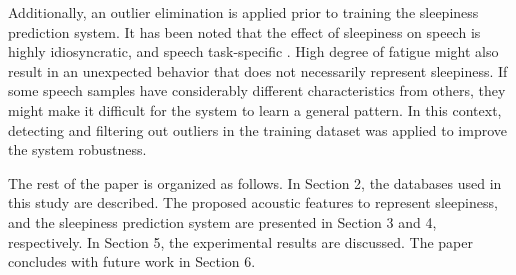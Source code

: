 
Additionally, an outlier elimination is applied prior to training the sleepiness prediction system.
It has been noted that the effect of sleepiness on speech is highly idiosyncratic, and speech task-specific \cite{Greeley2007, Vogel2011}.
High degree of fatigue might also result in an unexpected behavior that does not necessarily represent sleepiness.
If some speech samples have considerably different characteristics from others, they might make it difficult for the system to learn a general pattern.
In this context, detecting and filtering out outliers in the training dataset was applied to improve the system robustness.  

The rest of the paper is organized as follows. In Section 2, the databases used in this study are described. The proposed acoustic features to represent sleepiness, and the sleepiness prediction system are presented in Section 3 and 4, respectively. In Section 5, the experimental results are discussed. The paper concludes with future work in Section 6.




